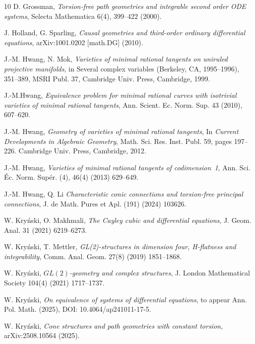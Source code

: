\documentclass[11pt]{amsart}
\theoremstyle{definition}
\begin{document}
\begin{thebibliography}{10}
 D. Grossman, \textit{Torsion‑free path geometries and integrable second order ODE systems}, Selecta Mathematica 6(4), 399--422 (2000). 

 J. Holland, G. Sparling, \textit{Causal geometries and third-order ordinary differential equations},  	arXiv:1001.0202 [math.DG] (2010).

 J.-M. Hwang, N. Mok, \textit{Varieties of minimal rational tangents on uniruled projective manifolds}, in
Several complex variables (Berkeley, CA, 1995–1996), 351–389, MSRI Publ. 37, Cambridge Univ. Press,
Cambridge, 1999.

 J.-M.Hwang, \textit{Equivalence problem for minimal rational curves with isotrivial varieties of minimal
rational tangents}, Ann. Scient. Ec. Norm. Sup. 43 (2010), 607--620.

 J.-M. Hwang, \textit{Geometry of varieties of minimal rational tangents}, In \emph{Current Developments in Algebraic Geometry}, Math. Sci. Res. Inst. Publ. 59, pages 197--226. Cambridge Univ. Press, Cambridge, 2012.

 J.-M. Hwang, \textit{Varieties of minimal rational tangents of codimension~1}, Ann. Sci. \'Ec. Norm. Sup\'er. (4), 46(4) (2013) 629--649.

 J.-M. Hwang, Q. Li \textit{Characteristic conic connections and torsion-free principal connections}, J. de Math. Pures et Apl. (191) (2024) 103626.


 W. Kry\'nski, O. Makhmali, \textit{The Cayley cubic and differential equations}, J. Geom. Anal. 31 (2021) 6219--6273.

 W. Kry\'nski, T. Mettler, \textit{GL(2)-structures in dimension four, H-flatness and integrability}, Comm. Anal. Geom. 27(8) (2019) 1851--1868.

 W. Kry\'nski, \textit{$GL(2)$-geometry and complex structures}, J. London Mathematical Society 104(4) (2021) 1717--1737.

 W. Kry\'nski, \textit{On equivalence of systems of differential equations}, to appear Ann. Pol. Math. (2025), DOI: 10.4064/ap241011-17-5.

  W. Kry\'nski, \textit{Cone structures and path geometries with constant torsion}, arXiv:2508.10564 (2025).


\end{thebibliography}
\end{document}
